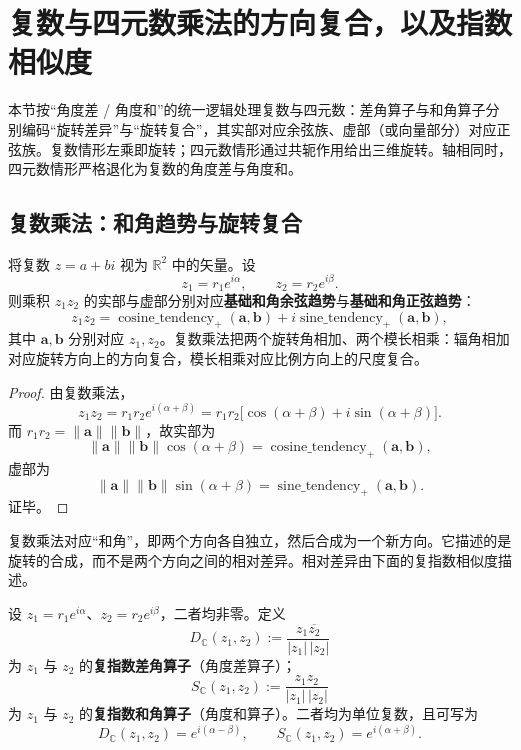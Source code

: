 \section{复数与四元数乘法的方向复合，以及指数相似度}
\label{sec:complex_quaternion_exponential_similarity}

本节按“角度差 / 角度和”的统一逻辑处理复数与四元数：差角算子与和角算子分别编码“旋转差异”与“旋转复合”，其实部对应余弦族、虚部（或向量部分）对应正弦族。复数情形左乘即旋转；四元数情形通过共轭作用给出三维旋转。轴相同时，四元数情形严格退化为复数的角度差与角度和。

\subsection{复数乘法：和角趋势与旋转复合}

\begin{proposition}\label{prop:complex_multiplication}
将复数 $z=a+bi$ 视为 $\mathbb R^2$ 中的矢量。设
\[
z_1=r_1e^{i\alpha},\qquad z_2=r_2e^{i\beta}.
\]
则乘积 $z_1z_2$ 的实部与虚部分别对应\textbf{基础和角余弦趋势}与\textbf{基础和角正弦趋势}：
\[
z_1z_2
=
\operatorname{cosine\_tendency}_+(\mathbf a,\mathbf b)
+
i\operatorname{sine\_tendency}_+(\mathbf a,\mathbf b),
\]
其中 $\mathbf a,\mathbf b$ 分别对应 $z_1,z_2$。复数乘法把两个旋转角相加、两个模长相乘：辐角相加对应旋转方向上的方向复合，模长相乘对应比例方向上的尺度复合。
\end{proposition}

\begin{proof}
由复数乘法，
\[
z_1z_2
=
r_1r_2e^{i(\alpha+\beta)}
=
r_1r_2\bigl[\cos(\alpha+\beta)+i\sin(\alpha+\beta)\bigr].
\]
而 $r_1r_2=\|\mathbf a\|\|\mathbf b\|$，故实部为
\[
\|\mathbf a\|\|\mathbf b\|\cos(\alpha+\beta)
=
\operatorname{cosine\_tendency}_+(\mathbf a,\mathbf b),
\]
虚部为
\[
\|\mathbf a\|\|\mathbf b\|\sin(\alpha+\beta)
=
\operatorname{sine\_tendency}_+(\mathbf a,\mathbf b).
\]
证毕。
\end{proof}

\begin{remark}
复数乘法对应“和角”，即两个方向各自独立，然后合成为一个新方向。它描述的是旋转的合成，而不是两个方向之间的相对差异。相对差异由下面的复指数相似度描述。
\end{remark}

\begin{definition}[复指数差角算子与和角算子]\label{def:complex_diff_sum}
设 $z_1=r_1e^{i\alpha}$、$z_2=r_2e^{i\beta}$，二者均非零。定义
\[
\boxed{
D_{\mathbb C}(z_1,z_2):=\frac{z_1\overline{z_2}}{|z_1|\,|z_2|}
}
\]
为 $z_1$ 与 $z_2$ 的\textbf{复指数差角算子}（角度差算子）；
\[
\boxed{
S_{\mathbb C}(z_1,z_2):=\frac{z_1z_2}{|z_1|\,|z_2|}
}
\]
为 $z_1$ 与 $z_2$ 的\textbf{复指数和角算子}（角度和算子）。二者均为单位复数，且可写为
\[
D_{\mathbb C}(z_1,z_2)=e^{i(\alpha-\beta)},\qquad
S_{\mathbb C}(z_1,z_2)=e^{i(\alpha+\beta)}.
\]
\end{definition}

